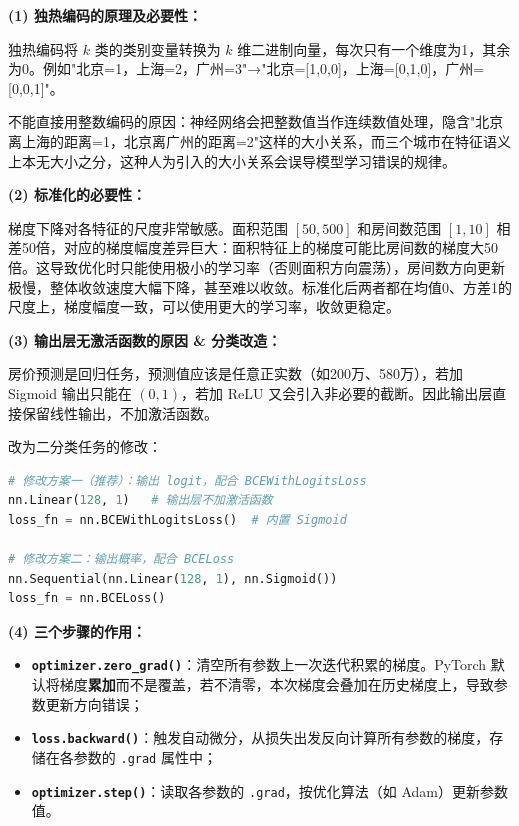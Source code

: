 \documentclass[a4paper,11pt]{ctexart}
\begin{document}
\begin{solutionbox}[参考答案与详细解析]
    \textbf{(1) 独热编码的原理及必要性：}

    独热编码将 $k$ 类的类别变量转换为 $k$ 维二进制向量，每次只有一个维度为1，其余为0。例如"北京=1，上海=2，广州=3"→"北京=[1,0,0]，上海=[0,1,0]，广州=[0,0,1]"。

    不能直接用整数编码的原因：神经网络会把整数值当作连续数值处理，隐含"北京离上海的距离=1，北京离广州的距离=2"这样的大小关系，而三个城市在特征语义上本无大小之分，这种人为引入的大小关系会误导模型学习错误的规律。

    \textbf{(2) 标准化的必要性：}

    梯度下降对各特征的尺度非常敏感。面积范围 $[50, 500]$ 和房间数范围 $[1, 10]$ 相差50倍，对应的梯度幅度差异巨大：面积特征上的梯度可能比房间数的梯度大50倍。这导致优化时只能使用极小的学习率（否则面积方向震荡），房间数方向更新极慢，整体收敛速度大幅下降，甚至难以收敛。标准化后两者都在均值0、方差1的尺度上，梯度幅度一致，可以使用更大的学习率，收敛更稳定。

    \textbf{(3) 输出层无激活函数的原因 \& 分类改造：}

    房价预测是回归任务，预测值应该是任意正实数（如200万、580万），若加 Sigmoid 输出只能在 $(0,1)$，若加 ReLU 又会引入非必要的截断。因此输出层直接保留线性输出，不加激活函数。

    改为二分类任务的修改：
    \begin{lstlisting}[language=Python]
# 修改方案一（推荐）：输出 logit，配合 BCEWithLogitsLoss
nn.Linear(128, 1)   # 输出层不加激活函数
loss_fn = nn.BCEWithLogitsLoss()  # 内置 Sigmoid

# 修改方案二：输出概率，配合 BCELoss
nn.Sequential(nn.Linear(128, 1), nn.Sigmoid())
loss_fn = nn.BCELoss()
    \end{lstlisting}

    \textbf{(4) 三个步骤的作用：}

    \begin{itemize}
        \item \textbf{\texttt{optimizer.zero\_grad()}}：清空所有参数上一次迭代积累的梯度。PyTorch 默认将梯度\textbf{累加}而不是覆盖，若不清零，本次梯度会叠加在历史梯度上，导致参数更新方向错误；
        \item \textbf{\texttt{loss.backward()}}：触发自动微分，从损失出发反向计算所有参数的梯度，存储在各参数的 \texttt{.grad} 属性中；
        \item \textbf{\texttt{optimizer.step()}}：读取各参数的 \texttt{.grad}，按优化算法（如 Adam）更新参数值。
    \end{itemize}


\end{solutionbox}
\end{document}
